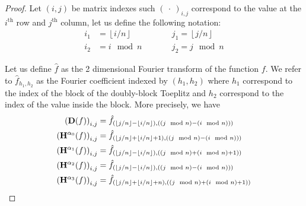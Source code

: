 \begin{proof}



Let $(i, j)$ be matrix indexes such $(\ \cdot\ )_{i, j}$ correspond to the value at the $i^\textrm{th}$ row and $j^\textrm{th}$ column, let us define the following notation:
\begin{align*}
    i_1 &= \left\lfloor i/n \right\rfloor \quad \quad &&j_1 = \left\lfloor j/n \right\rfloor \\
    i_2 &= i \mod n \quad \quad &&j_2 = j \mod n
\end{align*}

Let us define $\hat{f}$ as the 2 dimensional Fourier transform of the function $f$. We refer to $\hat{f}_{h_1, h_2}$ as the Fourier coefficient indexed by $(h_1, h_2)$ where $h_1$ correspond to the index of the block of the doubly-block Toeplitz and $h_2$ correspond to the index of the value inside the block. More precisely, we have 
\begin{align}
    \leftmat \mathbf{D}(f) \rightmat_{i, j} &= \hat{f}_{(\left\lfloor j/n \right\rfloor - \left\lfloor i/n \right\rfloor), ((j \mod n) - (i \mod n)))} \label{appendix-eq:expression_fourier} \\
    \leftmat \mathbf{H}^{\alpha_0}(f) \rightmat_{i, j} &= \hat{f}_{(\left\lfloor j/n \right\rfloor + \left\lfloor i/n \right\rfloor + 1), ((j \mod n) - (i \mod n)))} \\
    \leftmat \mathbf{H}^{\alpha_1}(f) \rightmat_{i, j} &= \hat{f}_{(\left\lfloor j/n \right\rfloor - \left\lfloor i/n \right\rfloor), ((j \mod n) + (i \mod n) + 1))} \\
    \leftmat \mathbf{H}^{\alpha_2}(f) \rightmat_{i, j} &= \hat{f}_{(\left\lfloor j/n \right\rfloor - \left\lfloor i/n \right\rfloor), ((j \mod n) - (i \mod n)))} \\
    \leftmat \mathbf{H}^{\alpha_3}(f) \rightmat_{i, j} &= \hat{f}_{(\left\lfloor j/n \right\rfloor + \left\lfloor i/n \right\rfloor + n), ((j \mod n) + (i \mod n) + 1))}
\end{align}


\end{proof}
